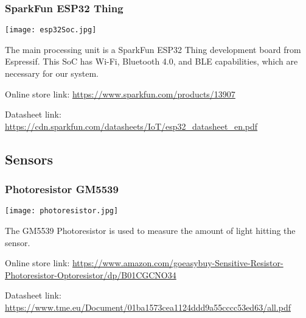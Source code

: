 \hypertarget{esp32}{}
\subsubsection{SparkFun ESP32 Thing}

\hspace{2em}
\texttt{[image: esp32Soc.jpg]}

\begin{flushleft}
    The main processing unit is a SparkFun ESP32 Thing development board from 
    Espressif. This SoC has Wi-Fi, Bluetooth 4.0, and BLE capabilities, which 
    are necessary for our system.
    \newline

    Online store link: \newline
    \footnotesize\url{https://www.sparkfun.com/products/13907}

    \normalsize Datasheet link: \newline
    \footnotesize\url{https://cdn.sparkfun.com/datasheets/IoT/esp32_datasheet_en.pdf}
\end{flushleft}

\subsection{Sensors}

\hypertarget{light}{}
\subsubsection{Photoresistor GM5539}

\hspace{2em}
\texttt{[image: photoresistor.jpg]}

\begin{flushleft}
    The GM5539 Photoresistor is used to measure the amount of light hitting the
     sensor.
    \newline

    Online store link: \newline
    \footnotesize\url{https://www.amazon.com/goeasybuy-Sensitive-Resistor-Photoresistor-Optoresistor/dp/B01CGCNO34}

    \normalsize Datasheet link: \newline
    \footnotesize\url{https://www.tme.eu/Document/01ba1573cea1124ddd9a55cccc53ed63/all.pdf}
\end{flushleft}

